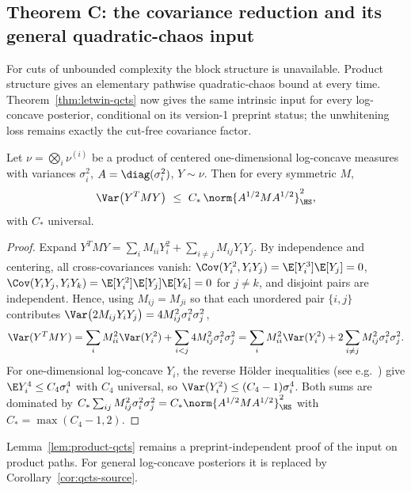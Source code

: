 \documentclass[../../main.tex]{subfiles}
\begin{document}
\subsection{Theorem C: the covariance reduction and its general quadratic-chaos input}
\label{sec:covariance-reduction}

For cuts of unbounded complexity the block structure is unavailable. Product structure gives an
elementary pathwise quadratic-chaos bound at every time. Theorem~\ref{thm:letwin-qcts} now gives
the same intrinsic input for every log-concave posterior, conditional on its version-1 preprint
status; the unwhitening loss remains exactly the cut-free covariance factor.

\begin{lemma}
\label{lem:product-qcts}
Let $\nu=\bigotimes_i\nu^{(i)}$ be a product of centered one-dimensional log-concave measures
with variances $\sigma_i^2$, $A=\diag(\sigma_i^2)$, $Y\sim\nu$. Then for every symmetric $M$,
\begin{equation}\label{eq:product-qcts}
  \Var\bigl(Y^TMY\bigr)\ \le\ C_*\,\norm{A^{1/2}MA^{1/2}}_\HS^2 ,
\end{equation}
with $C_*$ universal.
\end{lemma}

\begin{proof}
Expand $Y^TMY=\sum_iM_{ii}Y_i^2+\sum_{i\ne j}M_{ij}Y_iY_j$. By independence and centering, all
cross-covariances vanish: $\Cov(Y_i^2,Y_iY_j)=\E[Y_i^3]\E[Y_j]=0$,
$\Cov(Y_iY_j,Y_iY_k)=\E[Y_i^2]\E[Y_j]\E[Y_k]=0$ for $j\ne k$, and disjoint pairs are
independent. Hence, using $M_{ij}=M_{ji}$ so that each unordered pair $\{i,j\}$ contributes
$\Var\bigl(2M_{ij}Y_iY_j\bigr)=4M_{ij}^2\sigma_i^2\sigma_j^2$,
\[
  \Var(Y^TMY)=\sum_iM_{ii}^2\Var(Y_i^2)
  +\sum_{i<j}4M_{ij}^2\sigma_i^2\sigma_j^2
  =\sum_iM_{ii}^2\Var(Y_i^2)+2\sum_{i\ne j}M_{ij}^2\sigma_i^2\sigma_j^2 .
\]
For one-dimensional log-concave $Y_i$, the reverse H\"older inequalities (see e.g.\
\cite[Cor.~5]{KLnotes}) give $\E Y_i^4\le C_4\sigma_i^4$ with $C_4$ universal, so
$\Var(Y_i^2)\le(C_4-1)\sigma_i^4$. Both sums are dominated by
$C_*\sum_{ij}M_{ij}^2\sigma_i^2\sigma_j^2=C_*\norm{A^{1/2}MA^{1/2}}_\HS^2$ with
$C_*=\max(C_4-1,2)$.
\end{proof}

Lemma~\ref{lem:product-qcts} remains a preprint-independent proof of the input on product paths.
For general log-concave posteriors it is replaced by Corollary~\ref{cor:qcts-source}.
\end{document}
